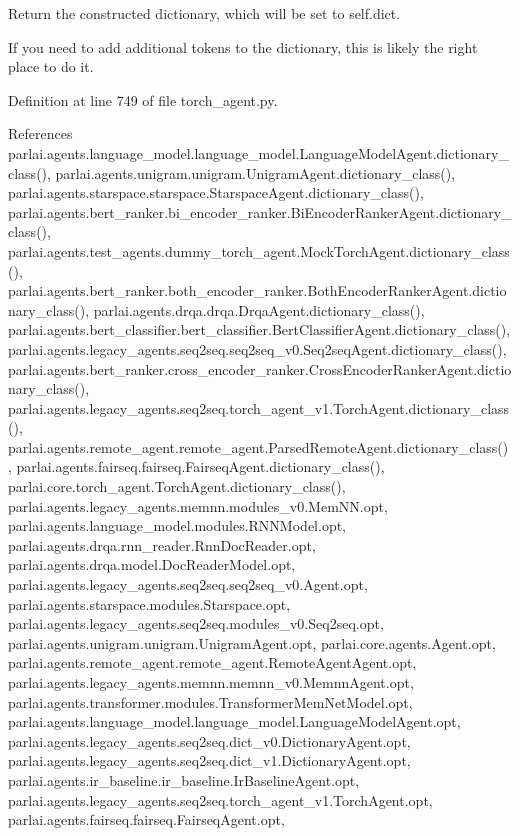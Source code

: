 \begin{DoxyVerb}Return the constructed dictionary, which will be set to self.dict.

If you need to add additional tokens to the dictionary, this is likely
the right place to do it.
\end{DoxyVerb}
 

Definition at line 749 of file torch\+\_\+agent.\+py.



References parlai.\+agents.\+language\+\_\+model.\+language\+\_\+model.\+Language\+Model\+Agent.\+dictionary\+\_\+class(), parlai.\+agents.\+unigram.\+unigram.\+Unigram\+Agent.\+dictionary\+\_\+class(), parlai.\+agents.\+starspace.\+starspace.\+Starspace\+Agent.\+dictionary\+\_\+class(), parlai.\+agents.\+bert\+\_\+ranker.\+bi\+\_\+encoder\+\_\+ranker.\+Bi\+Encoder\+Ranker\+Agent.\+dictionary\+\_\+class(), parlai.\+agents.\+test\+\_\+agents.\+dummy\+\_\+torch\+\_\+agent.\+Mock\+Torch\+Agent.\+dictionary\+\_\+class(), parlai.\+agents.\+bert\+\_\+ranker.\+both\+\_\+encoder\+\_\+ranker.\+Both\+Encoder\+Ranker\+Agent.\+dictionary\+\_\+class(), parlai.\+agents.\+drqa.\+drqa.\+Drqa\+Agent.\+dictionary\+\_\+class(), parlai.\+agents.\+bert\+\_\+classifier.\+bert\+\_\+classifier.\+Bert\+Classifier\+Agent.\+dictionary\+\_\+class(), parlai.\+agents.\+legacy\+\_\+agents.\+seq2seq.\+seq2seq\+\_\+v0.\+Seq2seq\+Agent.\+dictionary\+\_\+class(), parlai.\+agents.\+bert\+\_\+ranker.\+cross\+\_\+encoder\+\_\+ranker.\+Cross\+Encoder\+Ranker\+Agent.\+dictionary\+\_\+class(), parlai.\+agents.\+legacy\+\_\+agents.\+seq2seq.\+torch\+\_\+agent\+\_\+v1.\+Torch\+Agent.\+dictionary\+\_\+class(), parlai.\+agents.\+remote\+\_\+agent.\+remote\+\_\+agent.\+Parsed\+Remote\+Agent.\+dictionary\+\_\+class(), parlai.\+agents.\+fairseq.\+fairseq.\+Fairseq\+Agent.\+dictionary\+\_\+class(), parlai.\+core.\+torch\+\_\+agent.\+Torch\+Agent.\+dictionary\+\_\+class(), parlai.\+agents.\+legacy\+\_\+agents.\+memnn.\+modules\+\_\+v0.\+Mem\+N\+N.\+opt, parlai.\+agents.\+language\+\_\+model.\+modules.\+R\+N\+N\+Model.\+opt, parlai.\+agents.\+drqa.\+rnn\+\_\+reader.\+Rnn\+Doc\+Reader.\+opt, parlai.\+agents.\+drqa.\+model.\+Doc\+Reader\+Model.\+opt, parlai.\+agents.\+legacy\+\_\+agents.\+seq2seq.\+seq2seq\+\_\+v0.\+Agent.\+opt, parlai.\+agents.\+starspace.\+modules.\+Starspace.\+opt, parlai.\+agents.\+legacy\+\_\+agents.\+seq2seq.\+modules\+\_\+v0.\+Seq2seq.\+opt, parlai.\+agents.\+unigram.\+unigram.\+Unigram\+Agent.\+opt, parlai.\+core.\+agents.\+Agent.\+opt, parlai.\+agents.\+remote\+\_\+agent.\+remote\+\_\+agent.\+Remote\+Agent\+Agent.\+opt, parlai.\+agents.\+legacy\+\_\+agents.\+memnn.\+memnn\+\_\+v0.\+Memnn\+Agent.\+opt, parlai.\+agents.\+transformer.\+modules.\+Transformer\+Mem\+Net\+Model.\+opt, parlai.\+agents.\+language\+\_\+model.\+language\+\_\+model.\+Language\+Model\+Agent.\+opt, parlai.\+agents.\+legacy\+\_\+agents.\+seq2seq.\+dict\+\_\+v0.\+Dictionary\+Agent.\+opt, parlai.\+agents.\+legacy\+\_\+agents.\+seq2seq.\+dict\+\_\+v1.\+Dictionary\+Agent.\+opt, parlai.\+agents.\+ir\+\_\+baseline.\+ir\+\_\+baseline.\+Ir\+Baseline\+Agent.\+opt, parlai.\+agents.\+legacy\+\_\+agents.\+seq2seq.\+torch\+\_\+agent\+\_\+v1.\+Torch\+Agent.\+opt, parlai.\+agents.\+fairseq.\+fairseq.\+Fairseq\+Agent.\+opt, 